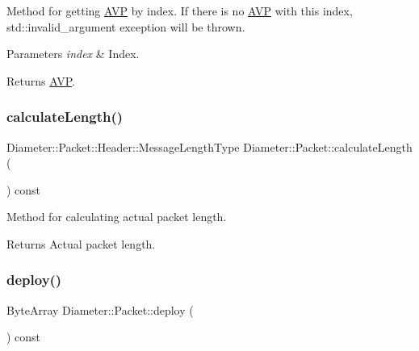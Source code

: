 Method for getting \hyperlink{classDiameter_1_1AVP}{A\+VP} by index. If there is no \hyperlink{classDiameter_1_1AVP}{A\+VP} with this index, std\+::invalid\+\_\+argument exception will be thrown. 


\begin{DoxyParams}{Parameters}
{\em index} & Index. \\
\hline
\end{DoxyParams}
\begin{DoxyReturn}{Returns}
\hyperlink{classDiameter_1_1AVP}{A\+VP}. 
\end{DoxyReturn}
\mbox{\label{classDiameter_1_1Packet_ae9926218252f08fcdbc937d16d496984}} 
\subsubsection{\texorpdfstring{calculate\+Length()}{calculateLength()}}
{\footnotesize\ttfamily Diameter\+::\+Packet\+::\+Header\+::\+Message\+Length\+Type Diameter\+::\+Packet\+::calculate\+Length (\begin{DoxyParamCaption}{ }\end{DoxyParamCaption}) const}



Method for calculating actual packet length. 

\begin{DoxyReturn}{Returns}
Actual packet length. 
\end{DoxyReturn}
\mbox{\label{classDiameter_1_1Packet_a6120f6d21c5d2f4c4ed4a8602953923c}} 
\subsubsection{\texorpdfstring{deploy()}{deploy()}\hspace{0.1cm}{\footnotesize\ttfamily [1/2]}}
{\footnotesize\ttfamily Byte\+Array Diameter\+::\+Packet\+::deploy (\begin{DoxyParamCaption}{ }\end{DoxyParamCaption}) const}



